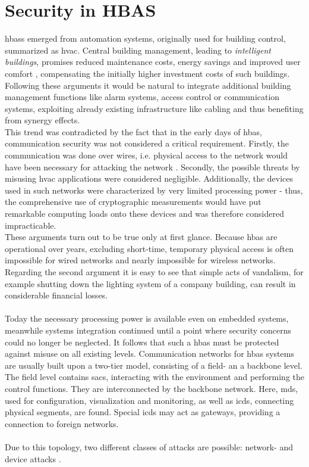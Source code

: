 \section{Security in HBAS}\label{hbaSec}
\glspl{hbas} emerged from automation systems, originally used for building control, summarized as \gls{hvac}.
Central building management, leading to \textit{intelligent buildings}, promises
reduced maintenance costs, energy savings and improved user comfort \cite{1435745}, compensating the initially higher investment costs of such buildings.
Following these arguments it would be natural to integrate additional building management functions like alarm systems, access control or communication systems,
exploiting already existing infrastructure like cabling and thus benefiting from synergy effects.
\\
This trend was contradicted by the fact that in the early days of \gls{hbas}, communication security was not considered a critical requirement.
Firstly, the communication was done over wires,
i.e. physical access to the network would have been necessary for attacking the network \cite{knxSpec}. Secondly, the possible threats by misusing \gls{hvac} applications
were considered negligible. Additionally, the devices used in such networks were characterized by very limited processing power - thus, the comprehensive
use of cryptographic measurements would have put remarkable computing loads onto these devices and was therefore considered impracticable.
\\
These arguments turn out to be true only at first glance. Because \gls{hbas} are operational over years, excluding short-time, temporary physical access is often impossible
for wired networks and nearly impossible for
wireless networks. Regarding the second argument it is easy to see that simple acts of vandalism, for example shutting down the lighting system of a company building, can result
in considerable financial losses.
\\
\\
Today the necessary processing power is available even on embedded systems, meanwhile systems integration continued until a point where security concerns could
no longer be neglected. It follows that such a \gls{hbas} must be protected against misuse on all existing levels. 
Communication networks for \gls{hbas} systems are usually built upon a two-tier model, consisting of a field- an a backbone level. The field level contains \glspl{sac},
interacting with the environment and performing the control functions. They are interconnected by the backbone network. Here, \glspl{md}, used for configuration,
visualization and monitoring, as well as \glspl{icd}, connecting physical segments, are found. Special \glspl{icd} may act as gateways, providing a connection to foreign networks. 
\\
\\
Due to this topology, two different classes of attacks are possible: network- and device attacks \cite{5332331}.

